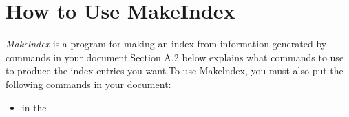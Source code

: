 \section{How to Use MakeIndex}
\textit{Makelndex} is a program for making an index from information generated by
\cmd{\index} commands in your document.Section A.2 below explains what \cmd{\index}
commands to use to produce the index entries you want.To use Makelndex,
you must also put the following commands in your document:

\begin{itemize}
  \item \cmd{\usepackage{makeindx}} in the
\end{itemize}